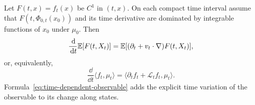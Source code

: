 \documentclass[12pt,a4paper,oneside]{book}
\begin{document}
\begin{theorem}
\label{thm:transport}
\label{src:p9q9}
Let $F(t,x)=f_t(x)$ be $C^1$ in $(t,x)$. On each compact time interval assume that $F(t,\Phi_{0,t}(x_0))$ and its time 
derivative are dominated by integrable functions of $x_0$ under $\mu_0$. Then
\begin{equation*}
    \frac{\,\mathrm{d}}{\,\mathrm{d} t}\mathbb{E}[F(t,X_t)] = \mathbb{E}[(\partial_t+v_t\cdot\nabla)F(t,X_t)],
\end{equation*}
or, equivalently,
\begin{equation}
    \frac{\dd}{\dd t}\langle f_t,\mu_t\rangle = \langle\partial_t f_t+\mathcal L_t f_t,\mu_t\rangle.
    \label{eq:time-dependent-observable}
\end{equation}
Formula~\eqref{eq:time-dependent-observable} adds the explicit time variation of the observable to its change along states.
\end{theorem}
\end{document}
